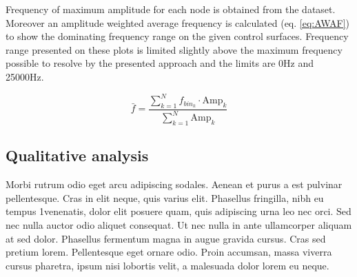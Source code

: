 Frequency of maximum amplitude for each node is obtained from the dataset. Moreover an amplitude weighted average frequency is calculated (eq. \ref{eq:AWAF}) to show the dominating frequency range on the given control surfaces. Frequency range presented on these plots is limited slightly above the maximum frequency possible to resolve by the presented approach and the limits are 0Hz and 25000Hz.

\begin{equation} \label{eq:AWAF}
\bar{f} = \frac{\sum_{k=1}^{N} f_{bin_k} \cdot \text{Amp}_k}{\sum_{k=1}^{N} \text{Amp}_{k}}
\end{equation}


\subsection{Qualitative analysis} \label{fft_res_qual}
Morbi rutrum odio eget arcu adipiscing sodales. Aenean et purus a est pulvinar pellentesque. Cras in elit neque, quis varius elit. Phasellus fringilla, nibh eu tempus 1venenatis, dolor elit posuere quam, quis adipiscing urna leo nec orci. Sed nec nulla auctor odio aliquet consequat. Ut nec nulla in ante ullamcorper aliquam at sed dolor. Phasellus fermentum magna in augue gravida cursus. Cras sed pretium lorem. Pellentesque eget ornare odio. Proin accumsan, massa viverra cursus pharetra, ipsum nisi lobortis velit, a malesuada dolor lorem eu neque.

